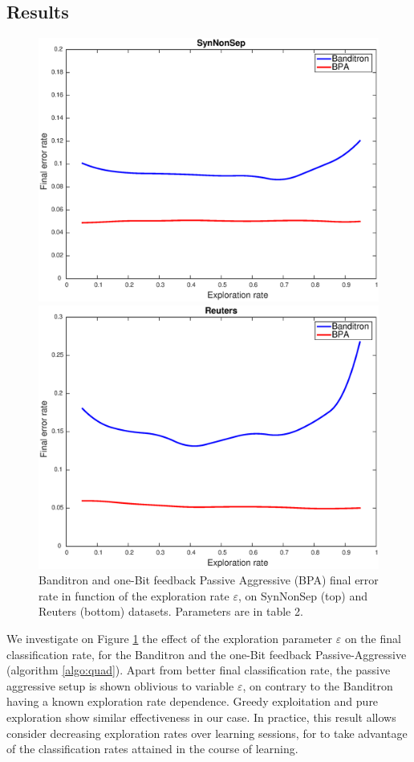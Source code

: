 \documentclass[preprint,12pt,authoryear]{elsarticle}
\begin{document}
\subsection{Results}

\begin{figure}[htp]
	\centerline{\includegraphics[width=.7\linewidth]{figs/SynNonSep_gamma.eps}}
	\centerline{\includegraphics[width=.7\linewidth]{figs/Reuters_gamma.eps}}
	\caption{Banditron and one-Bit feedback Passive Aggressive (BPA) final error rate in function of the exploration rate $\varepsilon$, on SynNonSep (top) and Reuters (bottom) datasets. Parameters are in table 2.}
	\label{pic:BPASNSerr}

	
\end{figure}

We investigate on Figure \ref{pic:BPASNSerr} %
the effect of the exploration parameter $\varepsilon$ on the final classification rate, for the Banditron and the one-Bit feedback Passive-Aggressive (algorithm \ref{algo:quad}). Apart from better final classification rate, the passive aggressive setup is shown oblivious to variable $\varepsilon$, on contrary to the Banditron having a known exploration rate dependence. Greedy exploitation and pure exploration show similar effectiveness in our case. In practice, this result allows consider decreasing exploration rates over learning sessions, for to take advantage of the classification rates attained in the course of learning. 
\end{document}
